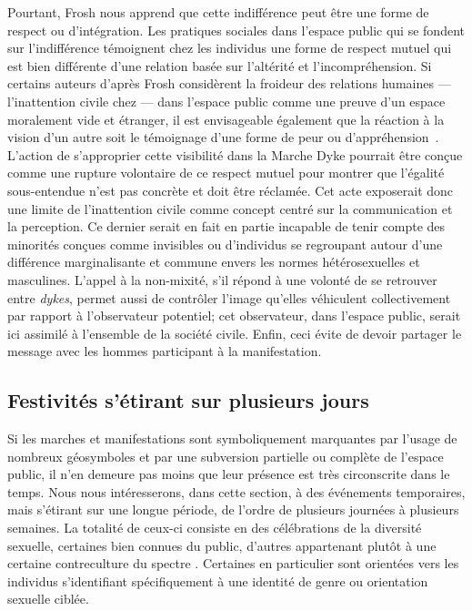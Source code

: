 Pourtant, Frosh nous apprend que cette indifférence peut être une forme de respect ou d'intégration.
Les pratiques sociales dans l'espace public qui se fondent sur l'indifférence témoignent chez les individus une forme de respect mutuel qui est bien différente d'une relation basée sur l'altérité et l'incompréhension.
Si certains auteurs d'après Frosh considèrent la froideur des relations humaines --- l'inattention civile chez \citet{Goffman1956} --- dans l'espace public comme une preuve d'un espace moralement vide et étranger, il est envisageable également que la réaction à la vision d'un autre soit le témoignage d'une forme de peur ou d'appréhension~\citep[279--280]{Frosh2006}.
L'action de s'approprier cette visibilité dans la Marche Dyke pourrait être conçue comme une rupture volontaire de ce respect mutuel pour montrer que l'égalité sous-entendue n'est pas concrète et doit être réclamée.
Cet acte exposerait donc une limite de l'inattention civile comme concept centré sur la communication et la perception.
Ce dernier serait en fait en partie incapable de tenir compte des minorités conçues comme invisibles ou d'individus se regroupant autour d'une différence marginalisante et commune envers les normes hétérosexuelles et masculines.
L'appel à la non-mixité, s'il répond à une volonté de se retrouver entre \emph{dykes}, permet aussi de contrôler l'image qu'elles véhiculent collectivement par rapport à l'observateur potentiel; cet observateur, dans l'espace public, serait ici assimilé à l'ensemble de la société civile.
Enfin, ceci évite de devoir partager le message avec les hommes participant à la manifestation.


\subsection{Festivités s'étirant sur plusieurs jours}
\label{sec:festivitesplusieursjours}
Si les marches et manifestations sont symboliquement marquantes par l'usage de nombreux géosymboles et par une subversion partielle ou complète de l'espace public, il n’en demeure pas moins que leur présence est très circonscrite dans le temps.
Nous nous intéresserons, dans cette section, à des événements temporaires, mais s'étirant sur une longue période, de l'ordre de plusieurs journées à plusieurs semaines.
La totalité de ceux-ci consiste en des célébrations de la diversité sexuelle, certaines bien connues du public, d'autres appartenant plutôt à une certaine contreculture du spectre \lgbt.
Certaines en particulier sont orientées vers les individus s'identifiant spécifiquement à une identité de genre ou orientation sexuelle ciblée.

